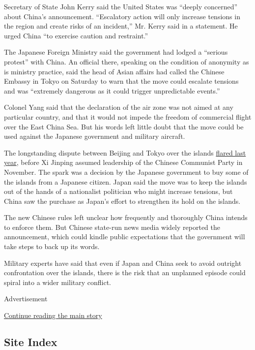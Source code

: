 Secretary of State John Kerry said the United States was ``deeply
concerned'' about China's announcement. ``Escalatory action will only
increase tensions in the region and create risks of an incident,'' Mr.
Kerry said in a statement. He urged China ``to exercise caution and
restraint.''~

The Japanese Foreign Ministry said the government had lodged a ``serious
protest'' with China. An official there, speaking on the condition of
anonymity as is ministry practice, said the head of Asian affairs had
called the Chinese Embassy in Tokyo on Saturday to warn that the move
could escalate tensions and was ``extremely dangerous as it could
trigger unpredictable events.''

Colonel Yang said that the declaration of the air zone was not aimed at
any particular country, and that it would not impede the freedom of
commercial flight over the East China Sea. But his words left little
doubt that the move could be used against the Japanese government and
military aircraft.

The longstanding dispute between Beijing and Tokyo over the islands
\href{http://www.nytimes3xbfgragh.onion/2012/09/23/world/asia/islands-dispute-tests-resolve-of-china-and-japan.html}{flared
last year}, before Xi Jinping assumed leadership of the Chinese
Communist Party in November. The spark was a decision by the Japanese
government to buy some of the islands from a Japanese citizen. Japan
said the move was to keep the islands out of the hands of a nationalist
politician who might increase tensions, but China saw the purchase as
Japan's effort to strengthen its hold on the islands.

The new Chinese rules left unclear how frequently and thoroughly China
intends to enforce them. But Chinese state-run news media widely
reported the announcement, which could kindle public expectations that
the government will take steps to back up its words.

Military experts have said that even if Japan and China seek to avoid
outright confrontation over the islands, there is the risk that an
unplanned episode could spiral into a wider military conflict.

Advertisement

\protect\hyperlink{after-bottom}{Continue reading the main story}

\hypertarget{site-index}{%
\subsection{Site Index}\label{site-index}}

